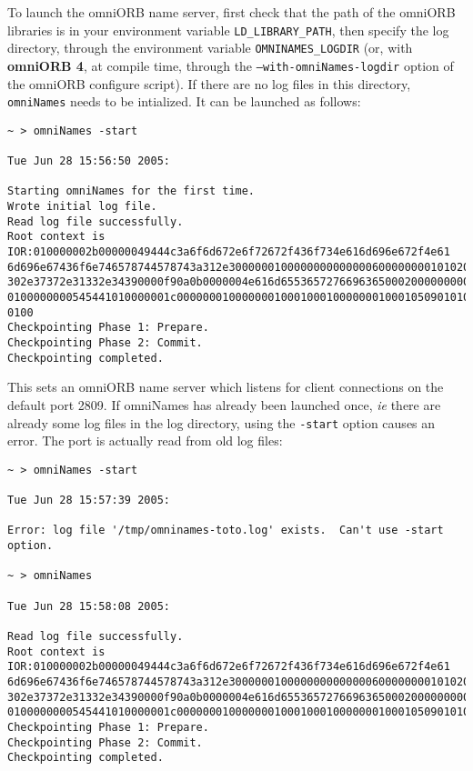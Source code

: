 To launch the omniORB name server, first check that the path of the omniORB
libraries is in your environment variable \texttt{LD\_LIBRARY\_PATH}, then
specify the log directory, through the environment variable
\texttt{OMNINAMES\_LOGDIR} (or, with \textbf{omniORB 4}, at compile time,
through the \texttt{--with-omniNames-logdir} option of the omniORB configure
script). If there are no log files in this directory,
\texttt{omniNames} needs to be intialized. It can be launched as
follows: 
{\footnotesize
\begin{verbatim}
~ > omniNames -start

Tue Jun 28 15:56:50 2005:

Starting omniNames for the first time.
Wrote initial log file.
Read log file successfully.
Root context is IOR:010000002b00000049444c3a6f6d672e6f72672f436f734e616d696e672f4e61
6d696e67436f6e746578744578743a312e300000010000000000000060000000010102000d0000003134
302e37372e31332e34390000f90a0b0000004e616d655365727669636500020000000000000008000000
0100000000545441010000001c0000000100000001000100010000000100010509010100010000000901
0100
Checkpointing Phase 1: Prepare.
Checkpointing Phase 2: Commit.
Checkpointing completed.
\end{verbatim}
}

This sets an omniORB name server which listens for client connections
on the default port 2809. If omniNames has already been launched once,
\emph{ie} there are already some log files in the log directory, using
the \texttt{-start} option causes an error. The port is actually read
from old log files: {\footnotesize
\begin{verbatim}
~ > omniNames -start

Tue Jun 28 15:57:39 2005:

Error: log file '/tmp/omninames-toto.log' exists.  Can't use -start option.

~ > omniNames  

Tue Jun 28 15:58:08 2005:

Read log file successfully.
Root context is IOR:010000002b00000049444c3a6f6d672e6f72672f436f734e616d696e672f4e61
6d696e67436f6e746578744578743a312e300000010000000000000060000000010102000d0000003134
302e37372e31332e34390000f90a0b0000004e616d655365727669636500020000000000000008000000
0100000000545441010000001c0000000100000001000100010000000100010509010100010000000901
Checkpointing Phase 1: Prepare.
Checkpointing Phase 2: Commit.
Checkpointing completed.
\end{verbatim}
}

